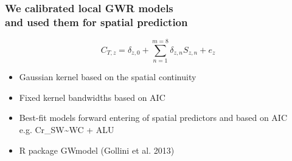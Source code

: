 \documentclass[10pt, compress]{beamer}
\begin{document}
\begin{frame}[fragile]
  \frametitle{We calibrated local GWR models \protect\\ and used them for spatial prediction}

  \begin{equation*}
    C_{T,z} = \delta_{z,0} + \sum_{n=1}^{m=8}\delta_{z,n}S_{z,n} + e_z
    \end{equation*}
  \begin{itemize}
        \item \alert{Gaussian kernel} based on the spatial continuity
        \pause
        \item \alert{Fixed kernel bandwidths} based on AIC
        \pause
        \item \alert{Best-fit models} forward entering of spatial predictors and based on AIC \\
        \centering e.g. Cr\_SW\textasciitilde WC + ALU \\
        \pause
        \raggedright
        \item \alert{R package GWmodel} (Gollini et al. 2013)
      \end{itemize}
  
\end{frame}




\end{document}
